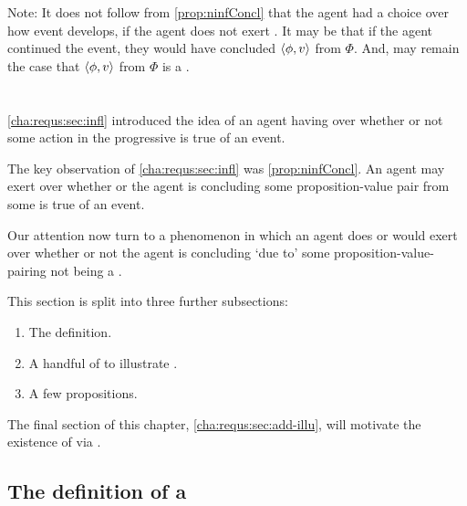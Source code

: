 \begin{note}
  Note:
  It does not follow from \autoref{prop:ninfConcl} that the agent had a choice over how event develops, if the agent does not exert \ninf{}.
  It may be that if the agent continued the event, they would have concluded \(\langle \phi, v \rangle\) from \(\Phi\).
  And, may remain the case that \(\langle \phi, v \rangle\) from \(\Phi\) is a \fc{}.
\end{note}

\section{}
\label{cha:requs:sec:definition}

\begin{note}
  \autoref{cha:requs:sec:infl} introduced the idea of an agent having \ninf{} over whether or not some action in the progressive is true of an event.

  The key observation of \autoref{cha:requs:sec:infl} was \autoref{prop:ninfConcl}.
  An agent may exert \ninf{} over whether or the agent is concluding some proposition-value pair from some \poP{} is true of an event.

  Our attention now turn to a phenomenon in which an agent does or would exert \ninf{} over whether or not the agent is concluding `due to' some proposition-value-\poP{} pairing not being a \fc{}.
\end{note}

\begin{note}
  This section is split into three further subsections:

  \begin{enumerate}[label=]
  \item

    The definition.
  \item

    A handful of  to illustrate .
  \item

    A few propositions.
  \end{enumerate}

  The final section of this chapter, \autoref{cha:requs:sec:add-illu}, will motivate the existence of  via \tR{}.
\end{note}


\subsection{The definition of a \requ{}}
\label{cha:requs:sec:definition}

